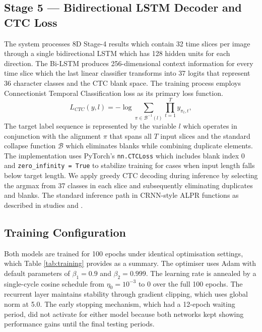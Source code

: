 \documentclass{ieeeaccess}
\begin{document}
\subsection{Stage 5 — Bidirectional LSTM Decoder and CTC Loss}
The system processes 8D Stage-4 results which contain 32 time slices per image through a single bidirectional LSTM which has 128 hidden units for each direction. The Bi-LSTM produces 256-dimensional context information for every time slice which the last linear classifier transforms into 37 logits that represent 36 character classes and the CTC blank space. The training process employs Connectionist Temporal Classification loss \cite{b3} as its primary loss function.
\begin{equation}
L_{CTC}(y, l) = - \log \sum_{\pi \in \mathcal{B}^{-1}(l)} \prod_{t=1}^{T} y_{\pi_t, t},
\end{equation}
The target label sequence is represented by the variable $l$ which operates in conjunction with the alignment $\pi$ that spans all $T$ input slices and the standard collapse function $\mathcal{B}$ which eliminates blanks while combining duplicate elements. The implementation uses PyTorch's \texttt{nn.CTCLoss} which includes blank index 0 and \texttt{zero\_infinity = True} to stabilize training for cases when input length falls below target length. We apply greedy CTC decoding during inference by selecting the argmax from 37 classes in each slice and subsequently eliminating duplicates and blanks. The standard inference path in CRNN-style ALPR functions as described in studies \cite{b12} and \cite{b14}.

\subsection{Training Configuration}
Both models are trained for 100 epochs under identical optimisation settings, which Table \ref{tab:training} provides as a summary. The optimiser uses Adam \cite{b8} with default parameters of $\beta_1 = 0.9$ and $\beta_2 = 0.999$. The learning rate is annealed by a single-cycle cosine schedule \cite{b33} from $\eta_0 = 10^{-3}$ to 0 over the full 100 epochs. The recurrent layer maintains stability through gradient clipping, which uses global norm at 5.0. The early stopping mechanism, which had a 12-epoch waiting period, did not activate for either model because both networks kept showing performance gains until the final testing periods.
\end{document}
